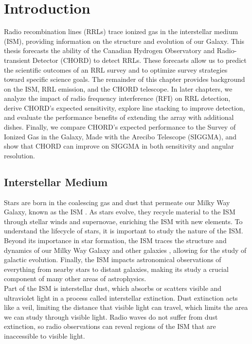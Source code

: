 \chapter{Introduction}
Radio recombination lines (RRLs) trace ionized gas in the interstellar medium (ISM), providing information on the structure and evolution of our Galaxy. This thesis forecasts the ability of the Canadian Hydrogen Observatory and Radio-transient Detector (CHORD) to detect RRLs. These forecasts allow us to predict the scientific outcomes of an RRL survey and to optimize survey strategies toward specific science goals. The remainder of this chapter provides background on the ISM, RRL emission, and the CHORD telescope. In later chapters, we analyze the impact of radio frequency interference (RFI) on RRL detection, derive CHORD's expected sensitivity, explore line stacking to improve detection, and evaluate the performance benefits of extending the array with additional dishes. Finally, we compare CHORD's expected performance to the Survey of Ionized Gas in the Galaxy, Made with the Arecibo Telescope (SIGGMA), and show that CHORD can improve on SIGGMA in both sensitivity and angular resolution.

\section{Interstellar Medium}
Stars are born in the coalescing gas and dust that permeate our Milky Way Galaxy, known as the ISM \cite{carrollIntroductionModernAstrophysics2017}. As stars evolve, they recycle material to the ISM through stellar winds and supernovae, enriching the ISM with new elements. To understand the lifecycle of stars, it is important to study the nature of the ISM. Beyond its importance in star formation, the ISM traces the structure and dynamics of our Milky Way Galaxy and other galaxies \cite{carrollIntroductionModernAstrophysics2017}, allowing for the study of galactic evolution. Finally, the ISM impacts astronomical observations of everything from nearby stars to distant galaxies, making its study a crucial component of many other areas of astrophysics. \\

Part of the ISM is interstellar dust, which absorbs or scatters visible and ultraviolet light in a process called interstellar extinction. Dust extinction acts like a veil, limiting the distance that visible light can travel, which limits the area we can study through visible light. Radio waves do not suffer from dust extinction, so radio observations can reveal regions of the ISM that are inaccessible to visible light. \\

